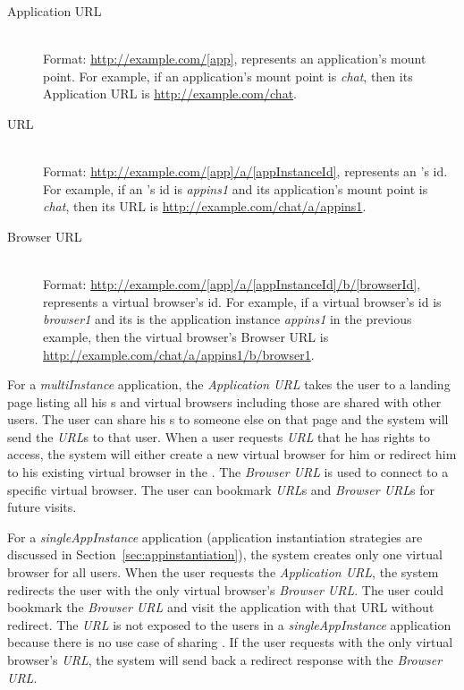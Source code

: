 \begin{description}

\item[Application URL] \label{itm:appurl} \hfill \\
Format: \url{http://example.com/[app]}, \code{[app]} represents an
application's mount point.   For example, if an application's mount point is
\emph{chat},  then its Application URL is \url{http://example.com/chat}.


\item[\appins{} URL] \label{itm:appinsurl} \hfill \\
Format: \url{http://example.com/[app]/a/[appInstanceId]},
\code{[appInstanceId]} represents an \appins{}'s id.  For example, if an
\appins{}'s id is \emph{appins1} and its application's mount point is
\emph{chat}, then its \appins{} URL is
\url{http://example.com/chat/a/appins1}.


\item[Browser URL] \label{itm:vburl} \hfill \\
Format: \url{http://example.com/[app]/a/[appInstanceId]/b/[browserId]},
\code{[browserId]} represents a virtual browser's id. For example, if a
virtual browser's id is \emph{browser1} and its \appins{} is the application
instance \emph{appins1} in the previous example, then the virtual browser's
Browser URL is \url{http://example.com/chat/a/appins1/b/browser1}.

\end{description}

For a \emph{multiInstance} application, the \emph{Application URL} takes the
user to a landing page listing all his \appins{}s and virtual browsers
including those are shared with other users. The user can share his \appins{}s
to someone else on that page and the system will send the \emph{\appins{}
URL}s to that user. When a user requests \emph{\appins{} URL} that he has
rights to access, the system will either create a new virtual browser for him
or redirect him to his existing virtual browser in the \appins{}. The
\emph{Browser URL} is used to connect to a specific virtual browser. The user
can bookmark \emph{\appins{} URL}s and \emph{Browser URL}s for future visits.

For a \emph{singleAppInstance} application (application instantiation
strategies  are discussed in Section~\ref{sec:appinstantiation}), the system
creates only one virtual browser for all users. When the user requests the
\emph{Application URL}, the system redirects the user with the only virtual
browser's \emph{Browser URL}. The user could bookmark the \emph{Browser URL}
and visit the application with that URL without redirect. The \emph{\appins
URL} is not exposed to the users in a \emph{singleAppInstance} application
because there is no use case of sharing \appins. If the user requests with the
only virtual browser's \emph{\appins URL}, the system will send back a
redirect response with the \emph{Browser URL}.



